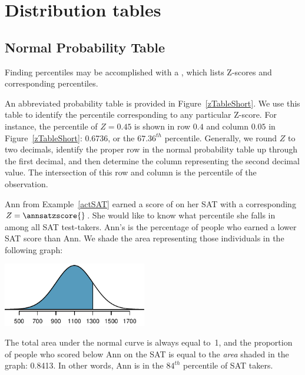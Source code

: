 \chapter{Distribution tables}
\label{distributionTables}

\section{Normal Probability Table}
\label{normalProbabilityTable}


Finding percentiles may be accomplished with a
,
which lists Z-scores and corresponding percentiles.

An abbreviated probability table is provided in
Figure~\ref{zTableShort}.
We use this table to identify the percentile corresponding
to any particular Z-score.
For instance, the percentile of $Z = 0.45$ is shown in row
$0.4$ and column $0.05$ in Figure~\ref{zTableShort}:
0.6736, or the $67.36^{th}$ percentile.
Generally, we round $Z$ to two decimals, identify the proper
row in the normal probability table up through the first decimal,
and then determine the column representing the second decimal
value.
The intersection of this row and column is the percentile
of the observation.

\begin{examplewrap}
\begin{nexample}{Ann from Example~\ref{actSAT} earned a score
    of \annsatscore{} on her SAT with a corresponding
    $Z = \annsatzscore{}$.
    She would like to know what percentile she falls in among
    all SAT test-takers.}
  Ann's  is the percentage of people who
  earned a lower SAT score than Ann.
  We shade the area representing those individuals in the
  following graph:
  \begin{center}
  \includegraphics[width=0.47\textwidth]
      {ch_distributions/figures/satBelow1300/satBelow1300}
  \end{center}
  The total area under the normal curve is always equal to~1,
  and the proportion of people who scored below Ann on the SAT
  is equal to the \emph{area} shaded in the graph: 0.8413.
  In other words, Ann is in the $84^{th}$ percentile of
  SAT takers.
\end{nexample}
\end{examplewrap}

